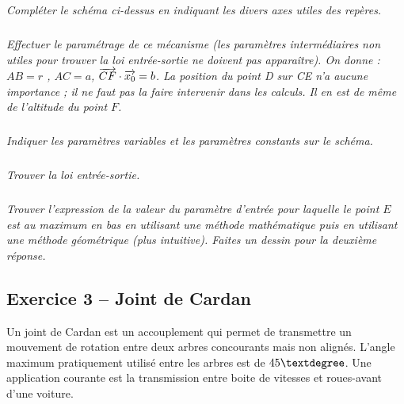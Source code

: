 \documentclass[11pt,oneside]{article}
\begin{document}
\subparagraph{}
\textit{Compléter le schéma ci-dessus en indiquant les divers axes utiles des repères.}




\subparagraph{}
\textit{Effectuer le paramétrage de ce mécanisme (les paramètres intermédiaires non utiles pour trouver la loi entrée-sortie ne doivent pas apparaître). On donne : $AB = r$ , $AC = a$, $\overrightarrow{CF}\cdot\overrightarrow{x_0}=b$. La position du point D sur CE n'a aucune importance ; il ne faut pas la faire intervenir dans les calculs. Il en est de même de l'altitude du point $F$.}




\subparagraph{}
\textit{Indiquer les paramètres variables et les paramètres constants sur le schéma.}




\subparagraph{}
\textit{Trouver la loi entrée-sortie. }




\subparagraph{}
\textit{Trouver l'expression de la valeur du paramètre d'entrée pour laquelle le point $E$ est au maximum en bas en utilisant une méthode mathématique puis en utilisant une méthode géométrique (plus intuitive). Faites un dessin pour la deuxième réponse.}




\subsection*{Exercice 3 -- Joint de Cardan}
\setcounter{subparagraph}{0}


Un joint de Cardan est un accouplement qui permet de transmettre un mouvement de rotation entre deux arbres concourants mais non alignés. L'angle maximum pratiquement utilisé entre les arbres est de $45\textdegree$. Une application courante est la transmission entre boite de vitesses  et roues-avant d’une voiture. 
\end{document}
